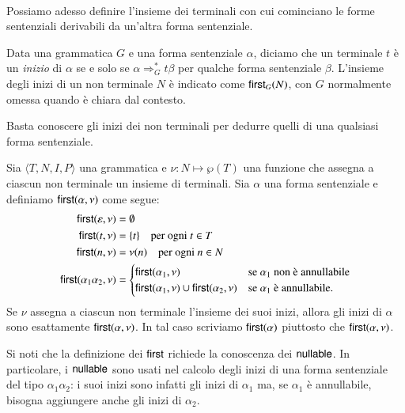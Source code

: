 \mbox{}\\

Possiamo adesso definire l'insieme dei terminali con cui cominciano
le forme sentenziali derivabili da un'altra forma sentenziale.
%
\begin{definition}\label{def:first}
Data una grammatica $G$ e una forma sentenziale $\alpha$, diciamo che un
terminale $t$ \`e un \emph{inizio} di $\alpha$ se e solo se
$\alpha\Rightarrow^*_Gt\beta$ per qualche forma sentenziale $\beta$.
L'insieme degli inizi di un non terminale
$N$ \`e indicato come $\mathsf{first}_G(N)$, con $G$
normalmente omessa quando \`e chiara dal contesto.
\end{definition}
%
\noindent
Basta conoscere gli inizi dei non terminali
per dedurre quelli di una qualsiasi forma sentenziale.
%
\begin{proposition}\label{prop:extend_first}
Sia $\langle T,N,I,P\rangle$ una grammatica e
$\nu:N\mapsto\wp(T)$ una funzione che assegna a ciascun non terminale
un insieme di terminali.
Sia $\alpha$ una forma sentenziale e definiamo $\mathsf{first}(\alpha,\nu)$ come
segue:
\begin{equation}\label{eq:first}
\begin{split}
  \mathsf{first}(\varepsilon,\nu)&=\emptyset\\
  \mathsf{first}(t,\nu)&=\{t\}\quad\text{per ogni $t\in T$}\\
  \mathsf{first}(n,\nu)&=\nu(n)\quad\text{per ogni $n\in N$}\\
  \mathsf{first}(\alpha_1\alpha_2,\nu)&=\begin{cases}
    \mathsf{first}(\alpha_1,\nu) & \text{se $\alpha_1$ non \`e annullabile}\\
    \mathsf{first}(\alpha_1,\nu)\cup\mathsf{first}(\alpha_2,\nu) &
      \text{se $\alpha_1$ \`e annullabile.}
  \end{cases}
\end{split}
\end{equation}
Se $\nu$ assegna a ciascun non terminale l'insieme dei suoi inizi,
allora gli inizi di $\alpha$ sono esattamente $\mathsf{first}(\alpha,\nu)$.
In tal caso scriviamo $\mathsf{first}(\alpha)$ piuttosto che $\mathsf{first}(\alpha,\nu)$.
\end{proposition}
%
\noindent
Si noti che la definizione dei $\mathsf{first}$ richiede la conoscenza dei $\mathsf{nullable}$.
In particolare, i $\mathsf{nullable}$ sono usati nel calcolo degli inizi di una
forma sentenziale del tipo $\alpha_1\alpha_2$: i suoi inizi sono infatti
gli inizi di $\alpha_1$ ma, se $\alpha_1$ \`e annullabile, bisogna aggiungere
anche gli inizi di $\alpha_2$.

